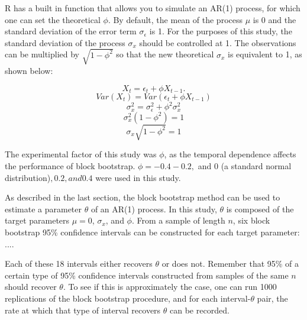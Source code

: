 \documentclass[12pt, letterpaper, titlepage]{article}
\begin{document}




R has a built in function that allows you to simulate an AR(1) process, for which one can set the theoretical $\phi$. By default, the mean of the process $\mu$ is 0 and the standard deviation of the error term $\sigma_{\epsilon}$ is 1. For the purposes of this study, the standard deviation of the process $\sigma_{x}$ should be controlled at 1. The observations can be multiplied by $\sqrt{1 - \phi^2}$ so that the new theoretical $\sigma_{x}$ is equivalent to 1, as shown below:

\[X_{t} = \epsilon_{t} + \phi X_{t-1}.\]
\[Var(X_{t}) = Var(\epsilon_{t} + \phi X_{t-1})\]
\[\sigma^2_{x} = \sigma^2_{\epsilon} + \phi^2 \sigma^2_{x}\]
\[\sigma^2_{x}(1 - \phi^2) = 1\]
\[\sigma_{x}\sqrt{1 - \phi^2} = 1\]

The experimental factor of this study was $\phi$, as the temporal dependence affects the performance of block bootstrap. $\phi = -0.4 -0.2,$ and $0$ (a standard normal distribution)$, 0.2, and 0.4$ were used in this study. 

As described in the last section, the block bootstrap method can be used to estimate a parameter $\theta$ of an AR(1) process. In this study, $\theta$ is composed of the target parameters $\mu = 0$, $\sigma_{x}$, and $\phi$. From a sample of length $n$, six block bootstrap 95\% confidence intervals can be constructed for each target parameter: ....

Each of these 18 intervals either recovers $\theta$ or does not. Remember that 95\% of a certain type of 95\% confidence intervals constructed from samples of the same $n$ should recover $\theta$. To see if this is approximately the case, one can run 1000 replications of the block bootstrap procedure, and for each interval-$\theta$ pair, the rate at which that type of interval recovers $\theta$ can be recorded.
\end{document}
